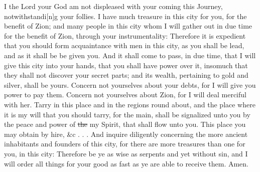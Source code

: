 					I the Lord your God am not displeased with your coming this Journey, notwithstandi[n]g your follies. I have much treasure in this city for you, for the benefit of Zion; and many people in this city whom I will gather out in due time for the benefit of Zion, through your instrumentality: Therefore it is expedient that you should form acquaintance with men in this city, as you shall be lead, and as it shall be be given you. And it shall come to pass, in due time, that I will give this city into your hands, that you shall have power over it, insomuch that they shall not discover your secret parts; and its wealth, pertaining to gold and silver, shall be yours. Concern not yourselves about your debts, for I will give you power to pay them. Concern not yourselves about Zion, for I will deal merciful with her. Tarry in this place and in the regions round about, and the place where it is my will that you should tarry, for the main, shall be signalized unto you by the peace and power of \sout{the} my Spirit, that shall flow unto you. This place you may obtain by hire, \&c . . . And inquire diligently concerning the more ancient inhabitants and founders of this city, for there are more treasures than one for you, in this city: Therefore be ye as wise as serpents and yet without sin, and I will order all things for your good as fast as ye are able to receive them. Amen.

\pagebreak{}
